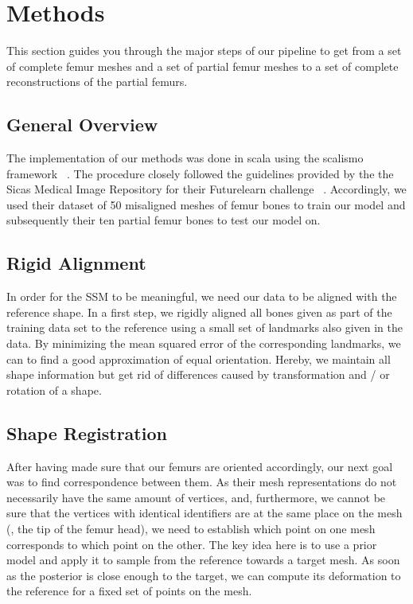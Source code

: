 \section{Methods}
\label{sec:methods}

This section guides you through the major steps of our pipeline to get from a set of complete femur meshes and a set of partial femur meshes to a set of complete reconstructions of the partial femurs.


\subsection{General Overview}
\label{subsec:overview}
The implementation of our methods was done in scala using the scalismo framework ~\cite{scalismo}.
The procedure closely followed the guidelines provided by the the Sicas Medical Image Repository for their Futurelearn challenge ~\cite{smir}. 
Accordingly, we used their dataset of 50 misaligned meshes of femur bones to train our model and subsequently their ten partial femur bones to test our model on. 


\subsection{Rigid Alignment}
\label{subsec:rigid}

In order for the SSM to be meaningful, we need our data to be aligned with the reference shape.
In a first step, we rigidly aligned all bones given as part of the training data set to the reference using a small set of landmarks also given in the data.
By minimizing the mean squared error of the corresponding landmarks, we can to find a good approximation of equal orientation.
Hereby, we maintain all shape information but get rid of differences caused by transformation and / or rotation of a shape.


\subsection{Shape Registration}
\label{subsec:registr}

After having made sure that our femurs are oriented accordingly, our next goal was to find correspondence between them.
As their mesh representations do not necessarily have the same amount of vertices, and, furthermore, we cannot be sure that the vertices with identical identifiers are at the same place on the mesh (\eg, the tip of the femur head), we need to establish which point on one mesh corresponds to which point on the other.
The key idea here is to use a prior model  and apply it to sample from the reference towards a target mesh.
As soon as the posterior  is close enough to the target, we can compute its deformation to the reference for a fixed set of points on the mesh.

